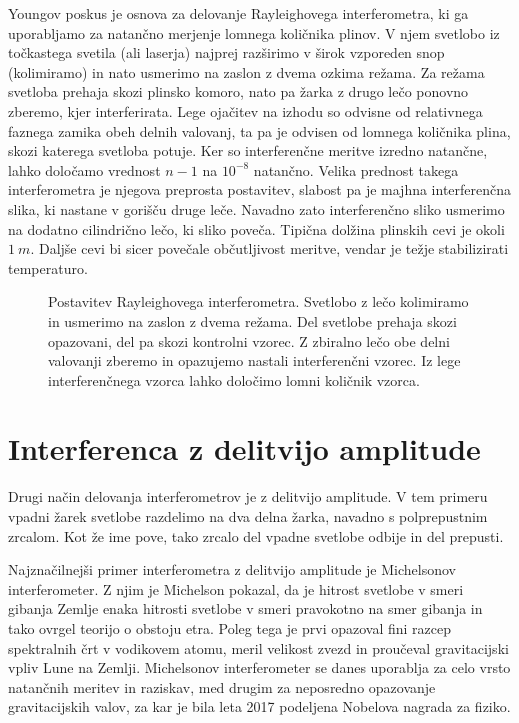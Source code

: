 \begin{remark}
Youngov poskus je osnova za delovanje Rayleighovega interferometra, ki ga uporabljamo
za natančno merjenje lomnega količnika plinov. V njem svetlobo 
iz točkastega svetila (ali laserja) najprej razširimo v širok vzporeden snop (kolimiramo)
in nato usmerimo na zaslon z dvema ozkima režama. Za režama svetloba prehaja skozi plinsko komoro, 
nato pa žarka z drugo lečo ponovno zberemo, kjer interferirata. Lege ojačitev na izhodu 
so odvisne od relativnega faznega zamika obeh delnih valovanj, ta pa je odvisen od
lomnega količnika plina, skozi katerega svetloba potuje. Ker so interferenčne
meritve izredno natančne, lahko določamo vrednost $n-1$ na $10^{-8}$ natančno. Velika
prednost takega interferometra je njegova preprosta postavitev, slabost pa je majhna
interferenčna slika, ki nastane v gorišču druge leče. Navadno zato interferenčno sliko 
usmerimo na dodatno cilindrično lečo, ki sliko poveča. Tipična dolžina plinskih cevi je okoli
$1~\si{m}$. Daljše cevi bi sicer povečale občutljivost meritve, vendar je težje
stabilizirati temperaturo.

\begin{figure}[ht]
\centering
\def\svgwidth{100truemm} 

\caption{Postavitev Rayleighovega interferometra. Svetlobo z lečo kolimiramo in 
usmerimo na zaslon z dvema režama. Del svetlobe prehaja skozi opazovani, del 
pa skozi kontrolni vzorec. Z zbiralno lečo obe delni valovanji zberemo in opazujemo
nastali interferenčni vzorec. Iz lege interferenčnega vzorca lahko določimo lomni količnik
vzorca.}
\label{fig:06_RayleighInt}
\end{figure}
\end{remark}

\section{Interferenca z delitvijo amplitude}
\label{chap:Michelson}
Drugi način delovanja interferometrov je z delitvijo amplitude. V tem primeru
vpadni žarek svetlobe razdelimo na dva delna žarka, navadno s polprepustnim zrcalom. 
Kot že ime pove, tako zrcalo del vpadne svetlobe odbije in del prepusti.

Najznačilnejši primer interferometra z delitvijo amplitude je Michelsonov interferometer.
Z njim je Michelson pokazal, da je hitrost svetlobe v smeri gibanja Zemlje enaka hitrosti
svetlobe v smeri pravokotno na smer gibanja in tako ovrgel teorijo o obstoju etra. Poleg
tega je prvi opazoval fini razcep spektralnih črt v vodikovem atomu, meril velikost zvezd in 
proučeval gravitacijski vpliv Lune na Zemlji. Michelsonov interferometer
se danes uporablja za celo vrsto natančnih meritev in raziskav, med drugim za neposredno opazovanje 
gravitacijskih valov, za kar je bila leta 2017 podeljena Nobelova nagrada za fiziko.

